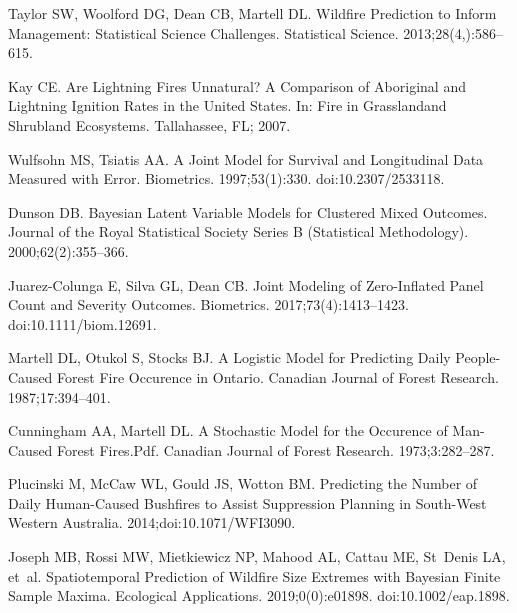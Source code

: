 \documentclass[10pt,letterpaper]{article}
\begin{document}
%
\begin{thebibliography}{10}

Taylor SW, Woolford DG, Dean CB, Martell DL.
\newblock Wildfire {{Prediction}} to {{Inform Management}}: {{Statistical
  Science Challenges}}.
\newblock Statistical Science. 2013;28(4,):586--615.

Kay CE.
\newblock Are Lightning Fires Unnatural? {{A}} Comparison of Aboriginal and
  Lightning Ignition Rates in the {{United States}}.
\newblock In: Fire in {{Grasslandand Shrubland Ecosystems}}. {Tallahassee, FL};
  2007.

Wulfsohn MS, Tsiatis AA.
\newblock A {{Joint Model}} for {{Survival}} and {{Longitudinal Data Measured}}
  with {{Error}}.
\newblock Biometrics. 1997;53(1):330.
\newblock doi:{10.2307/2533118}.

Dunson DB.
\newblock Bayesian {{Latent Variable Models}} for {{Clustered Mixed Outcomes}}.
\newblock Journal of the Royal Statistical Society Series B (Statistical
  Methodology). 2000;62(2):355--366.

Juarez-Colunga E, Silva GL, Dean CB.
\newblock Joint Modeling of Zero-Inflated Panel Count and Severity Outcomes.
\newblock Biometrics. 2017;73(4):1413--1423.
\newblock doi:{10.1111/biom.12691}.

Martell DL, Otukol S, Stocks BJ.
\newblock A Logistic Model for Predicting Daily People-Caused Forest Fire
  Occurence in {{Ontario}}.
\newblock Canadian Journal of Forest Research. 1987;17:394--401.

Cunningham AA, Martell DL.
\newblock A {{Stochastic Model}} for the {{Occurence}} of {{Man}}-Caused
  {{Forest Fires}}.Pdf.
\newblock Canadian Journal of Forest Research. 1973;3:282--287.

Plucinski M, McCaw WL, Gould JS, Wotton BM.
\newblock Predicting the Number of Daily Human-Caused Bushfires to Assist
  Suppression Planning in South-West {{Western Australia}}.
  2014;doi:{10.1071/WFI3090}.

Joseph MB, Rossi MW, Mietkiewicz NP, Mahood AL, Cattau ME, St~Denis LA, et~al.
\newblock Spatiotemporal Prediction of Wildfire Size Extremes with {{Bayesian}}
  Finite Sample Maxima.
\newblock Ecological Applications. 2019;0(0):e01898.
\newblock doi:{10.1002/eap.1898}.


\end{thebibliography}
\end{document}
